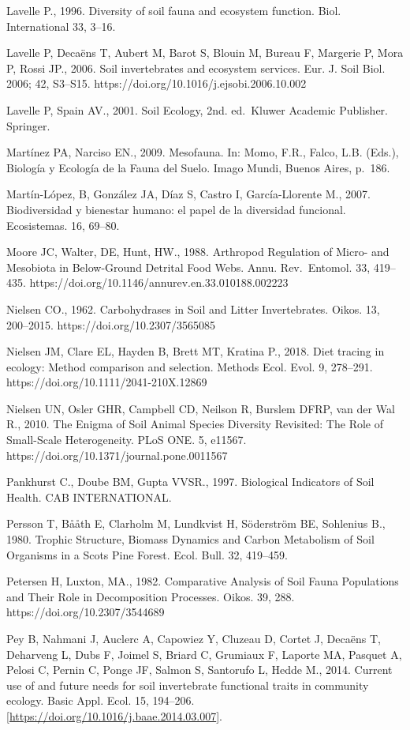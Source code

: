 \documentclass[10pt,oneside]{article}
\begin{document}
Lavelle P., 1996. Diversity of soil fauna and ecosystem function. Biol.
International 33, 3--16.

Lavelle P, Decaëns T, Aubert M, Barot S, Blouin M, Bureau F, Margerie P,
Mora P, Rossi JP., 2006. Soil invertebrates and ecosystem services. Eur.
J. Soil Biol. 2006; 42, S3--S15.
https://doi.org/10.1016/j.ejsobi.2006.10.002

Lavelle P, Spain AV., 2001. Soil Ecology, 2nd. ed.~Kluwer Academic
Publisher. Springer.

Martínez PA, Narciso EN., 2009. Mesofauna. In: Momo, F.R., Falco, L.B.
(Eds.), Biología y Ecología de la Fauna del Suelo. Imago Mundi, Buenos
Aires, p.~186.

Martín-López, B, González JA, Díaz S, Castro I, García-Llorente M.,
2007. Biodiversidad y bienestar humano: el papel de la diversidad
funcional. Ecosistemas. 16, 69--80.

Moore JC, Walter, DE, Hunt, HW., 1988. Arthropod Regulation of Micro-
and Mesobiota in Below-Ground Detrital Food Webs. Annu. Rev.~Entomol.
33, 419--435. https://doi.org/10.1146/annurev.en.33.010188.002223

Nielsen CO., 1962. Carbohydrases in Soil and Litter Invertebrates.
Oikos. 13, 200--2015. https://doi.org/10.2307/3565085

Nielsen JM, Clare EL, Hayden B, Brett MT, Kratina P., 2018. Diet tracing
in ecology: Method comparison and selection. Methods Ecol. Evol. 9,
278--291. https://doi.org/10.1111/2041-210X.12869

Nielsen UN, Osler GHR, Campbell CD, Neilson R, Burslem DFRP, van der Wal
R., 2010. The Enigma of Soil Animal Species Diversity Revisited: The
Role of Small-Scale Heterogeneity. PLoS ONE. 5, e11567.
https://doi.org/10.1371/journal.pone.0011567

Pankhurst C., Doube BM, Gupta VVSR., 1997. Biological Indicators of Soil
Health. CAB INTERNATIONAL.

Persson T, Bååth E, Clarholm M, Lundkvist H, Söderström BE, Sohlenius
B., 1980. Trophic Structure, Biomass Dynamics and Carbon Metabolism of
Soil Organisms in a Scots Pine Forest. Ecol. Bull. 32, 419--459.

Petersen H, Luxton, MA., 1982. Comparative Analysis of Soil Fauna
Populations and Their Role in Decomposition Processes. Oikos. 39, 288.
https://doi.org/10.2307/3544689

Pey B, Nahmani J, Auclerc A, Capowiez Y, Cluzeau D, Cortet J, Decaëns T,
Deharveng L, Dubs F, Joimel S, Briard C, Grumiaux F, Laporte MA, Pasquet
A, Pelosi C, Pernin C, Ponge JF, Salmon S, Santorufo L, Hedde M., 2014.
Current use of and future needs for soil invertebrate functional traits
in community ecology. Basic Appl. Ecol. 15, 194--206.
\href{https://doi.org/10.1016/j.baae.2014.03.007}{{[}https://doi.org/10.1016/j.baae.2014.03.007{]}}.
\end{document}
